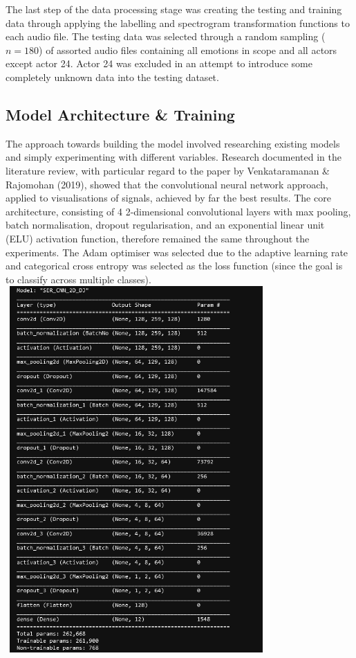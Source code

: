 \documentclass[12pt]{article}
\begin{document}
\noindent The last step of the data processing stage was creating the testing and training data through applying the labelling and spectrogram transformation functions to each audio file. The testing data was selected through a random sampling ($n = 180$) of assorted audio files containing all emotions in scope and all actors except actor 24. Actor 24 was excluded in an attempt to introduce some completely unknown data into the testing dataset.
\newpage
\subsection{Model Architecture \& Training}
The approach towards building the model involved researching existing models and simply experimenting with different variables. Research documented in the literature review, with particular regard to the paper by Venkataramanan \& Rajomohan (2019), showed that the convolutional neural network approach, applied to visualisations of signals, achieved by far the best results. The core architecture, consisting of 4 2-dimensional convolutional layers with max pooling, batch normalisation, dropout regularisation, and an exponential linear unit (ELU) activation function, therefore remained the same throughout the experiments. The Adam optimiser was selected due to the adaptive learning rate and categorical cross entropy was selected as the loss function (since the goal is to classify across multiple classes).
\\

\includegraphics[width=10cm,height=14cm]{figure_6_model_visualisation}
\\
\end{document}
